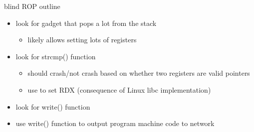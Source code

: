 \begin{frame}{blind ROP outline}
    \begin{itemize}
    \item look for gadget that pops a lot from the stack
        \begin{itemize}
        \item likely allows setting lots of registers
        \end{itemize}
    \item look for strcmp() function
        \begin{itemize}
        \item should crash/not crash based on whether two registers are valid pointers
        \item use to set RDX (consequence of Linux libc implementation)
        \end{itemize}
    \item look for write() function 
    \item use write() function to output program machine code to network
    \end{itemize}
\end{frame}
